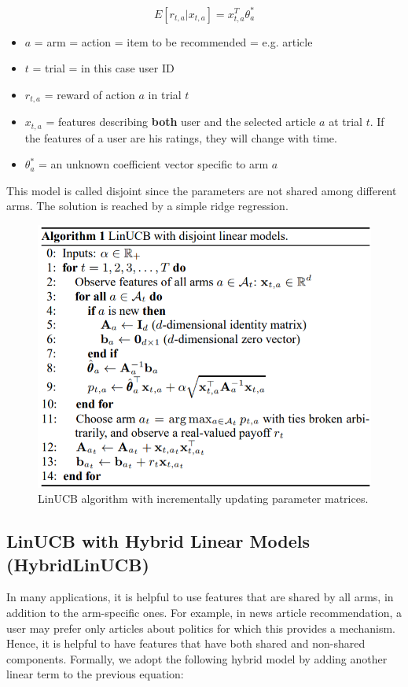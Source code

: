 \documentclass[12pt, titlepage]{article}
\begin{document}
$$
E[r_{t,a}|x_{t,a}] = x^T_{t,a}\theta^*_a
$$

\begin{itemize}
\item $a$ = arm = action = item to be recommended = e.g. article
\item $t$ = trial = in this case user ID
\item $r_{t,a}$ = reward of action $a$ in trial $t$ 
\item $x_{t,a}$ = features describing \textbf{both} user and the selected article $a$ at trial $t$. If the features of a user are his ratings, they will change with time.
\item $\theta^*_a$ = an unknown coefficient vector specific to arm $a$
\end{itemize}

This model is called disjoint since the parameters are not shared among different arms.
The solution is reached by a simple ridge regression.

\begin{figure}[h]
 \centering
 \includegraphics[scale=0.9]{img/LinUCB_alg}
 \caption{LinUCB algorithm with incrementally updating parameter matrices.\cite{cit:paper}}
 \label{fig:linUCB_alg}
\end{figure}

\subsection{LinUCB with Hybrid Linear Models (HybridLinUCB)}

In many applications, it is helpful to use features
that are shared by all arms, in addition to the arm-specific ones. For
example, in news article recommendation, a user may prefer only
articles about politics for which this provides a mechanism. Hence,
it is helpful to have features that have both shared and non-shared
components. Formally, we adopt the following hybrid model by
adding another linear term to the previous equation:
\end{document}

